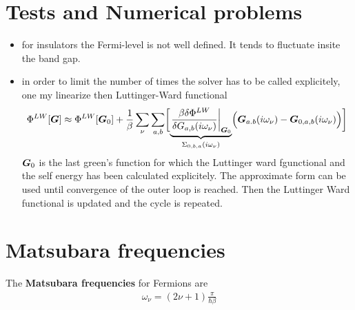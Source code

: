 \documentclass[11pt,a4paper]{report}
\begin{document}
\chapter{Tests and Numerical problems}
\begin{itemize}
\item for insulators the Fermi-level is not well defined. It tends to
  fluctuate insite the band gap.
\item in order to limit the number of times the solver has to be
  called explicitely, one my linearize then Luttinger-Ward functional
\begin{eqnarray}
\Phi^{LW}[\bm{G}]\approx \Phi^{LW}[\bm{G}_0]
+\frac{1}{\beta}\sum_\nu\sum_{a,b}\biggl[
\underbrace{
\left.\frac{\beta\delta\Phi^{LW}}{\delta{G}_{a,b}(i\omega_\nu)}\right|_{\bm{G}_0}
}_{\Sigma_{0,b,a}(i\omega_\nu)}
\Bigl(\bm{G}_{a.b}(i\omega_\nu)-\bm{G}_{0,a,b}(i\omega_\nu)\Bigr)
\biggr]
\end{eqnarray}
$\bm{G}_0$ is the last green's function for which the Luttinger ward
fgunctional and the self energy has been calculated explicitely. The
approximate form can be used until convergence of the outer loop is
reached. Then the Luttinger Ward functional is updated and the cycle
is repeated.

\end{itemize}



\appendix
\chapter{Matsubara frequencies}
\label{app:matsubarafreq}

The \textbf{Matsubara frequencies} for Fermions are
\begin{eqnarray*}
\omega_\nu=(2\nu+1)\frac{\pi}{\hbar\beta}
\end{eqnarray*}
\end{document}
